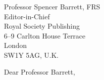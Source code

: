 \documentclass[10pt, a4paper]{letter} %
\begin{document}

\begin{letter}{
Professor Spencer Barrett, FRS\\
Editor-in-Chief\\
Royal Society Publishing\\
6--9 Carlton House Terrace\\
London\\
SW1Y 5AG, U.K.\\

}


\opening{Dear Professor Barrett,}







\end{letter}
\end{document}
